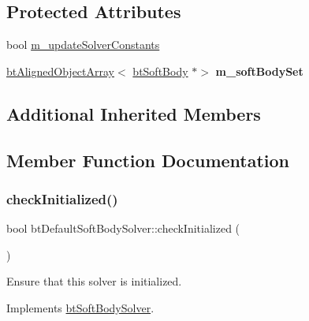 \subsection*{Protected Attributes}
\begin{DoxyCompactItemize}
\item 
bool \hyperlink{classbtDefaultSoftBodySolver_aa1801fb689244551e8ab11bf98eadc5f}{m\+\_\+update\+Solver\+Constants}
\item 
\mbox{\label{classbtDefaultSoftBodySolver_a2da739a719dd22af149f8fd93c020de5}} 
\hyperlink{classbtAlignedObjectArray}{bt\+Aligned\+Object\+Array}$<$ \hyperlink{classbtSoftBody}{bt\+Soft\+Body} $\ast$$>$ {\bfseries m\+\_\+soft\+Body\+Set}
\end{DoxyCompactItemize}
\subsection*{Additional Inherited Members}


\subsection{Member Function Documentation}
\mbox{\label{classbtDefaultSoftBodySolver_afa91458c5c1bf45d11bd0cc2b5a8fc71}} 
\subsubsection{\texorpdfstring{check\+Initialized()}{checkInitialized()}}
{\footnotesize\ttfamily bool bt\+Default\+Soft\+Body\+Solver\+::check\+Initialized (\begin{DoxyParamCaption}{ }\end{DoxyParamCaption})\hspace{0.3cm}{\ttfamily [virtual]}}

Ensure that this solver is initialized. 

Implements \hyperlink{classbtSoftBodySolver_aae0adf7ffc11cd7fafec927a54c654d5}{bt\+Soft\+Body\+Solver}.

\mbox{\label{classbtDefaultSoftBodySolver_ad56d843b5c510c0cb1e2399e20ab212a}} 
